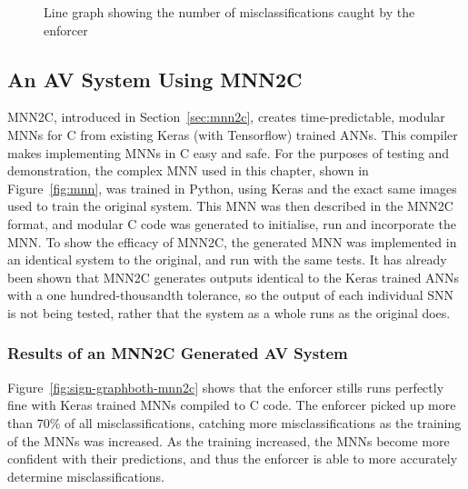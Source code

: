 
\begin{figure}[h]
	\centering
	\scalebox{0.9}{}
	\caption{Line graph showing the number of misclassifications caught by the enforcer \label{fig:sign-graphboth}}
\end{figure}

\subsection{An \ac{AV} System Using \acf{MNN2C}}
\ac{MNN2C}, introduced in Section~\ref{sec:mnn2c}, creates time-predictable, modular \acfp{MNN} for C from existing Keras (with Tensorflow) trained \acp{ANN}. 
This compiler makes implementing \acfp{MNN} in C easy and safe.
For the purposes of testing and demonstration, the complex \ac{MNN} used in this chapter, shown in Figure~\ref{fig:mnn}, was trained in Python, using Keras and the exact same images used to train the original system.
This \ac{MNN} was then described in the \ac{MNN2C} format, and modular C code was generated to initialise, run and incorporate the \ac{MNN}.
To show the efficacy of \ac{MNN2C}, the generated \ac{MNN} was implemented in an identical system to the original, and run with the same tests. 
It has already been shown that \ac{MNN2C} generates outputs identical to the Keras trained \acp{ANN} with a one hundred-thousandth tolerance, so the output of each individual \ac{SNN} is not being tested, rather that the system as a whole runs as the original does.

\subsubsection{Results of an \ac{MNN2C} Generated \ac{AV} System}
Figure~\ref{fig:sign-graphboth-mnn2c} shows that the enforcer stills runs perfectly fine with Keras trained \acp{MNN} compiled to C code.
The enforcer picked up more than 70\% of all misclassifications, catching more misclassifications as the training of the \acp{MNN} was increased. 
As the training increased, the \acp{MNN} become more confident with their predictions, and thus the enforcer is able to more accurately determine misclassifications.

